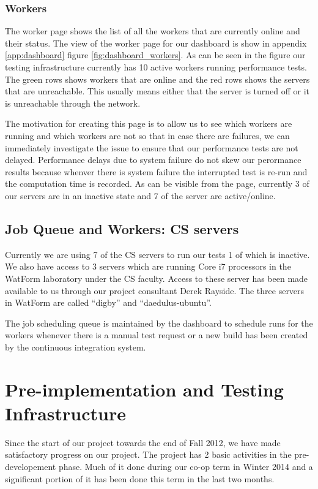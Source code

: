 \documentclass[11pt]{article}
\theoremstyle{definition}
\begin{document}
\subsubsection{Workers}
The worker page shows the list of all the workers that are currently online and their status. The view of the worker page for our dashboard is show in appendix \ref{app:dashboard} figure \ref{fig:dashboard_workers}. As can be seen in the figure our testing infrastructure currently has 10 active workers running performance tests. The green rows shows workers that are online and the red rows shows the servers that are unreachable. This usually means either that the server is turned off or it is unreachable through the network.

The motivation for creating this page is to allow us to see which workers are running and which workers are not so that in case there are failures, we can immediately investigate the issue to ensure that our performance tests are not delayed. Performance delays due to system failure do not skew our perormance results because whenver there is system failure the interrupted test is re-run and the computation time is recorded. As can be visible from the page, currently 3 of our servers are in an inactive state and 7 of the server are active/online.

\subsection{Job Queue and Workers: CS servers}
Currently we are using 7 of the CS servers to run our tests 1 of which is inactive. We also have access to 3 servers which are running Core i7 processors in the WatForm laboratory under the CS faculty. Access to these server has been made available to us through our project consultant Derek Rayside. The three servers in WatForm are called ``digby'' and ``daedulus-ubuntu''.

The job scheduling queue is maintained by the dashboard to schedule runs for the workers whenever there is a manual test request or a new build has been created by the continuous integration system.

\section{Pre-implementation and Testing Infrastructure}\label{sec:implementation}
Since the start of our project towards the end of Fall 2012, we have made satisfactory progress on our project. The project has 2 basic activities in the pre-developement phase. Much of it done during our co-op term in Winter 2014 and a significant portion of it has been done this term in the last two months.
\end{document}
